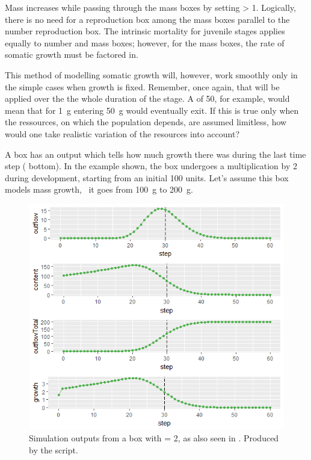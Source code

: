 Mass increases while passing through the mass  boxes by setting  > 1. Logically, there is no need for a reproduction box among the mass boxes parallel to the number reproduction box. The intrinsic mortality for juvenile stages applies equally to number and mass boxes; however, for the mass boxes, the rate of somatic growth must be factored in.

This method of modelling somatic growth will, however, work smoothly only in the simple cases when growth is fixed. Remember, once again, that  will be applied over the the whole duration of the stage. A  of 50, for example, would mean that for \SI{1}{\gram} entering \SI{50}{\gram} would eventually exit. If this is true only when the ressources, on which the population depends, are assumed limitless, how would one take realistic variation of the resources into account?
 
A  box has an output  which tells how much growth there was during the last time step ( bottom). In the example shown, the  box  undergoes a multiplication by 2 during development, starting from an initial 100 units. Let's assume this box models mass growth, \ie\ it goes from \SI{100}{\gram} to \SI{200}{\gram}.

 \begin{figure} [ht]
\centering
\includegraphics[width=.9\textwidth]{graphics/phys-dev-6}
\caption{Simulation outputs from a  box with  = 2, as also seen in . Produced by the  script.} 
\label{fig:phys-dev-6}
\end{figure}

